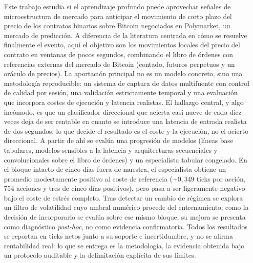 Este trabajo estudia si el aprendizaje profundo puede aprovechar señales de
microestructura de mercado para anticipar el movimiento de corto plazo del precio de los
contratos binarios sobre Bitcoin negociados en Polymarket, un mercado de predicción. A
diferencia de la literatura centrada en cómo se resuelve finalmente el evento, aquí el
objetivo son los movimientos locales del precio del contrato en ventanas de pocos
segundos, combinando el libro de órdenes con referencias externas del mercado de Bitcoin
(contado, futuros perpetuos y un oráculo de precios). La aportación principal no es un
modelo concreto, sino una metodología reproducible: un sistema de captura de datos
multifuente con control de calidad por sesión, una validación estrictamente temporal y una
evaluación que incorpora costes de ejecución y latencia realistas. El hallazgo central, y
algo incómodo, es que un clasificador direccional que acierta casi nueve de cada diez veces
deja de ser rentable en cuanto se introduce una latencia de entrada realista de dos
segundos: lo que decide el resultado es el coste y la ejecución, no el acierto direccional.
A partir de ahí se evalúa una progresión de modelos (líneas base tabulares, modelos
sensibles a la latencia y arquitecturas secuenciales y convolucionales sobre el libro de
órdenes) y un especialista tabular congelado. En el bloque intacto de cinco días fuera de
muestra, el especialista obtiene un promedio modestamente positivo al coste de referencia
($+0{,}349$ ticks por acción, 754 acciones y tres de cinco días positivos), pero pasa a ser
ligeramente negativo bajo el coste de estrés completo. Tras detectar un cambio de régimen se
explora un filtro de volatilidad cuyo umbral numérico procede del entrenamiento; como la
decisión de incorporarlo se evalúa sobre ese mismo bloque, su mejora se presenta como
diagnóstico \emph{post-hoc}, no como evidencia confirmatoria. Todos los resultados se reportan
en ticks netos junto a su soporte e incertidumbre, y no se afirma rentabilidad real: lo que
se entrega es la metodología, la evidencia obtenida bajo un protocolo auditable y la
delimitación explícita de sus límites.
